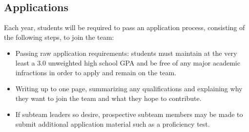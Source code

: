 \documentclass{proc}
\begin{document}
\subsection{Applications}
Each year, students will be required to pass an application process, consisting of the following steps, to join the team:
\begin{itemize}
  \item{Passing raw application requirements: students must maintain at the very least a 3.0 unweighted high school GPA and be free of any major academic infractions in order to apply and remain on the team.}
  \item{Writing up to one page, summarizing any qualifications and explaining why they want to join the team and what they hope to contribute.}
  \item{If subteam leaders so desire, prospective subteam members may be made to submit additional application material such as a proficiency test.}
\end{itemize}
\end{document}
